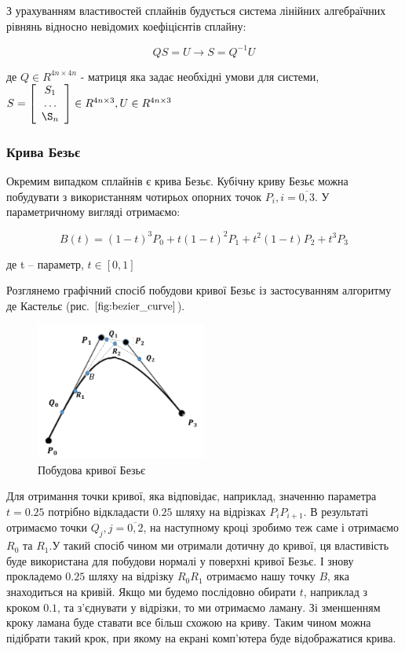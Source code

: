 \let\mypdfximage\pdfximage\def\pdfximage{\immediate\mypdfximage}\documentclass[14pt,a4paper]{extarticle}
\theoremstyle{definition}
\renewcommand{\[}{\begin{singlespace}\begin{equation*}}
\renewcommand{\]}{\end{equation*}\end{singlespace}}
\renewcommand{\+}{\discretionary{\mbox{\scriptsize$\hookleftarrow$}}{}{}}
\begin{document}
З урахуванням властивостей сплайнів будується система лінійних алгебраїчних рівнянь відносно невідомих коефіцієнтів сплайну:
\[QS=U \to S=Q^{-1}U\]
де $Q\in R^{4n\times4n}$ - матриця яка задає необхідні умови для системи, 
$S=\left[\begin{array}{c}S_1\\\dots\\\S_n\end{array}\right]\in R^{4n\times3}, U \in R^{4n\times3}$

\subsubsection{Крива Безьє}

Окремим випадком сплайнів є крива Безьє. Кубічну криву Безьє можна побудувати з використанням чотирьох опорних точок $P_i, i=\overline{0,3}$. У параметричному вигляді отримаємо:
\[B(t)=(1-t)^3P_0+t(1-t)^2P_1+t^2(1-t)P_2+t^3P_3\]
де t -- параметр, $t \in [0,1]$

Розглянемо графічний спосіб побудови кривої Безьє із застосуванням алгоритму де Кастельє (рис. $\ref{fig:bezier_curve}$).

\begin{figure}[!htb]
    \centering
    \includegraphics[width=0.5\textwidth]{bezier-curve.png}
    \caption{Побудова кривої Безьє}\label{fig:bezier_curve}
\end{figure}

Для отримання точки кривої, яка відповідає, наприклад, значенню параметра $t=0.25$ потрібно відкладасти $0.25$ шляху на відрізках $P_iP_{i+1}$. В результаті отримаємо точки $Q_{j}, j=\overline{0,2}$, на наступному кроці зробимо теж саме і отримаємо $R_0$ та $R_1$.У такий спосіб чином ми отримали дотичну до кривої, ця властивість буде використана для побудови нормалі у поверхні кривої Безьє. І знову прокладемо $0.25$ шляху на відрізку $R_0R_1$ отримаємо нашу точку $B$, яка знаходиться на кривій. Якщо ми будемо послідовно обирати $t$, наприклад з кроком $0.1$, та з'єднувати у відрізки, то ми отримаємо ламану. Зі зменшенням кроку ламана буде ставати все більш схожою на криву. Таким чином можна підібрати такий крок, при якому на екрані комп'ютера буде відображатися крива.
\end{document}
